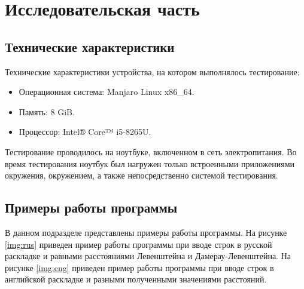 \chapter{Исследовательская часть}

\section{Технические характеристики}

Технические характеристики устройства, на котором выполнялось тестирование:

\begin{itemize}
	\item Операционная система: Manjaro \cite{manjaro} Linux x86\_64.
	\item Память: 8 GiB.
	\item Процессор: Intel® Core™ i5-8265U\cite{intel}.
\end{itemize}

Тестирование проводилось на ноутбуке, включенном в сеть электропитания. Во
время тестирования ноутбук был нагружен только встроенными приложениями
окружения, окружением, а также непосредственно системой тестирования.

\section{Примеры работы программы}

В данном подразделе представлены примеры работы программы. На рисунке
\ref{img:rus} приведен пример работы программы при вводе строк в русской
раскладке и равными расстояниями Левенштейна и Дамерау-Левенштейна. На рисунке
\ref{img:eng} приведен пример работы программы при вводе строк в английской
раскладке и разными полученными значениями расстояний.


